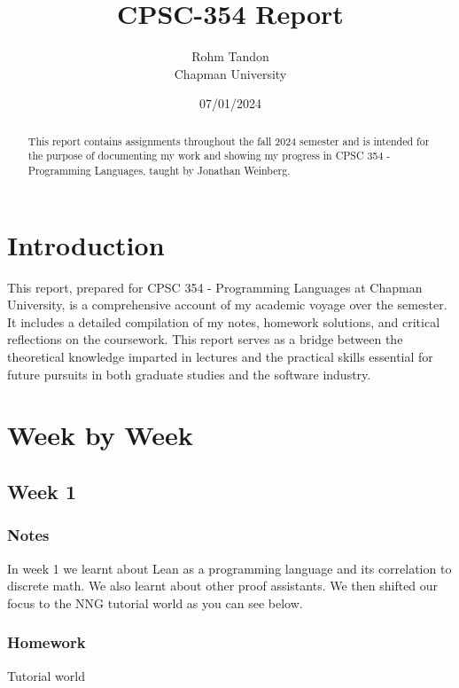 \documentclass{article}
\title{CPSC-354 Report}
\author{Rohm Tandon  \\ Chapman University}
\date{07/01/2024}
\theoremstyle{theorem}
\theoremstyle{definition}
\theoremstyle{remark}
\begin{document}
\maketitle 

\begin{abstract}
This report contains assignments throughout the fall 2024 semester and is intended for the purpose of documenting my work and showing my progress in CPSC 354 - Programming Languages, taught by Jonathan Weinberg.
\end{abstract}

\setcounter{tocdepth}{3}
\tableofcontents

\section{Introduction}\label{intro}

This report, prepared for CPSC 354 - Programming Languages at Chapman University, is a comprehensive account of my academic voyage over the semester. It includes a detailed compilation of my notes, homework solutions, and critical reflections on the coursework. This report serves as a bridge between the theoretical knowledge imparted in lectures and the practical skills essential for future pursuits in both graduate studies and the software industry.

\section{Week by Week}\label{homework}

\subsection{Week 1}

\subsubsection*{Notes}

In week 1 we learnt about Lean as a programming language and its correlation to discrete math. We also learnt about other proof assistants. We then shifted our focus to the NNG tutorial world as you can see below.

\subsubsection*{Homework}

Tutorial world 
\end{document}
